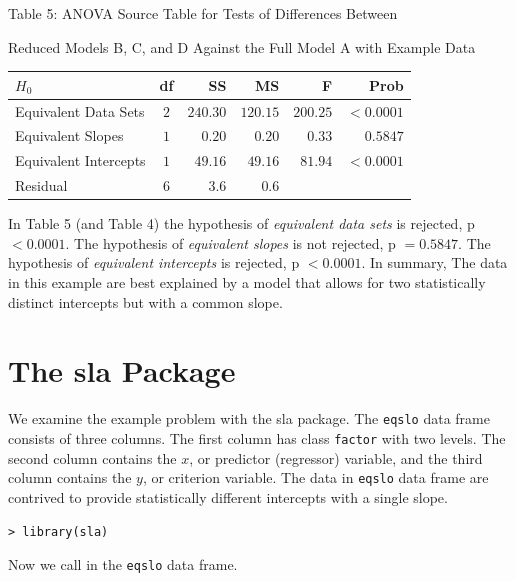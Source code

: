 \documentclass[11pt, oneside]{article}   	%
\begin{document}
 \begin{table} [h]
\centerline{Table 5:  ANOVA Source Table for Tests of Differences Between} 
\centerline{Reduced Models B, C, and D Against the Full Model A  with Example Data} 
\centering
\bigskip
\begin{tabular}{lcrrrr}
\hline
$ H_{0} $ &   df & SS     & MS     & F  &  Prob \\ 
\hline
\hline
Equivalent Data Sets     &    $ 2  $    &    $  240.30 $ &  $  120.15 $    &    $ 200.25 $  &  $ < 0.0001 $  \\
Equivalent Slopes     &    $  1  $    &    $   0.20 $ &  $  0.20  $    &    $  0.33  $  & $ 0.5847  $ \\
Equivalent Intercepts       &    $ 1  $    &    $  49.16 $ &  $  49.16 $    &    $ 81.94 $  & $ <0.0001 $ \\
\hline
Residual  &  6   &  3.6 &  0.6   &       &      \\  
\hline
\end{tabular} 
\end{table}
\bigskip

In Table 5 (and Table 4) the hypothesis of \emph{equivalent data sets} is rejected, p $ < 0.0001  $.  The hypothesis of \emph{ equivalent slopes} is not rejected, p $ = 0.5847 $.  The hypothesis of \emph{equivalent intercepts} is rejected, p $ < 0.0001  $.  In summary, The data in this example are best explained by a model that allows for two statistically distinct intercepts but with a common slope. 
\bigskip   
\section{ The sla Package}
We examine the example problem with the sla package.  The \texttt{eqslo} data frame consists of three columns.  The first column has class \texttt{factor} with two levels.  The second column contains the $ x  $, or predictor (regressor) variable, and the third column contains the $  y $, or criterion variable. The data in \texttt{eqslo} data frame are contrived to provide statistically different intercepts with a single slope. 
\vspace{ 3 mm}

\noindent \texttt{> library(sla)   } 

\vspace{3 mm}

\noindent Now we call in the \texttt{eqslo} data frame. 
 
\vspace{3 mm}
 
\end{document}
